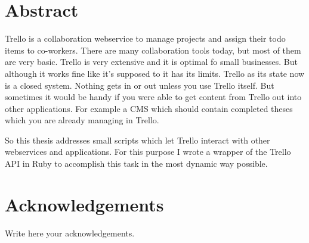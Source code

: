 \documentclass[twoside,12pt,a4paper]{report}
\begin{document}

\setcounter{page}{1}



\section*{Abstract}

Trello is a collaboration webservice to manage projects and assign their todo items to co-workers. There are many collaboration tools today, but most of them are very basic. Trello is very extensive and it is optimal fo small businesses. But although it works fine like it's supposed to it has its limits. Trello as its state now is a closed system. Nothing gets in or out unless you use Trello itself. But sometimes it would be handy if you were able to get content from Trello out into other applications. For example a CMS which should contain completed theses which you are already managing in Trello.
 
So this thesis addresses small scripts which let Trello interact with other webservices and applications. For this purpose I wrote a wrapper of the Trello API in Ruby to accomplish this task in the most dynamic way possible.
\newpage
\section*{Acknowledgements}

Write here your acknowledgements.

\cleardoublepage


\renewcommand{\baselinestretch}{1.3}
\small\normalsize

\tableofcontents

\renewcommand{\baselinestretch}{1}
\small\normalsize

\cleardoublepage

\end{document}
